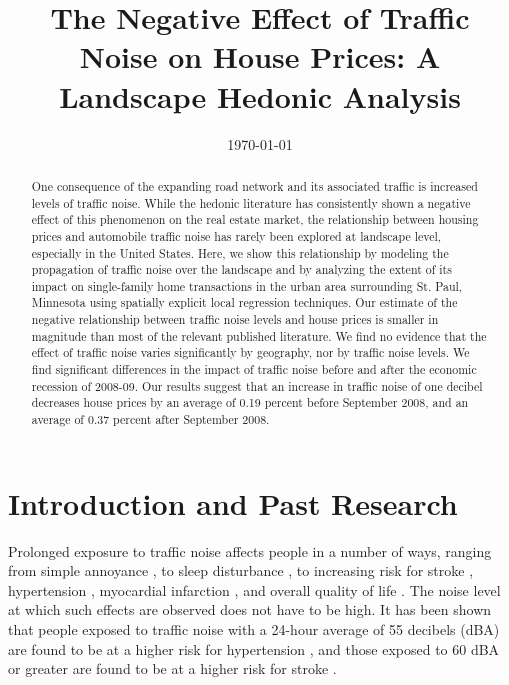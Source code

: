 \documentclass{article}\usepackage{graphicx, color}
\title{The Negative Effect of Traffic Noise on House Prices: A Landscape Hedonic Analysis}
\date{\today}
\begin{document}
\maketitle
\begin{singlespace}
\begin{abstract}
One consequence of the expanding road network and its associated traffic is increased levels of traffic noise.  While the hedonic literature has consistently shown a negative effect of this phenomenon on the real estate market, the relationship between housing prices and automobile traffic noise has rarely been explored at landscape level, especially in the United States. Here, we show this relationship by modeling the propagation of traffic noise over the landscape and by analyzing the extent of its impact on single-family home transactions in the urban area surrounding St. Paul, Minnesota using spatially explicit local regression techniques. Our estimate of the negative relationship between traffic noise levels and house prices is smaller in magnitude than most of the relevant published literature. We find no evidence that the effect of traffic noise varies significantly by geography, nor by traffic noise levels.  We find significant differences in the impact of traffic noise before and after the economic recession of 2008-09. Our results suggest that an increase in traffic noise of one decibel decreases house prices by an average of 0.19 percent before September 2008, and an average of 0.37 percent after September 2008.
\end{abstract}
\end{singlespace}

\section{Introduction and Past Research}\label{sec:lit}
Prolonged exposure to traffic noise affects people in a number of ways, ranging from simple annoyance \citep{Miedema2001, Ouis2001, Ohrstrom2007, DeKluizenaar2013, Weinhold2013}, to sleep disturbance , to increasing risk for stroke \citep{Sorensen2011}, hypertension \citep{Jarup2008, Bodin2009}, myocardial infarction \citep{Babisch2005}, and overall quality of life \citep{Shepherd2013}. The noise level at which such effects are observed does not have to be high.  It has been shown that people exposed to traffic noise with a 24-hour average of 55 decibels (dBA) are found to be at a higher risk for hypertension \citep{Barregard2009, Bodin2009}, and those exposed to 60 dBA or greater are found to be at a higher risk for stroke \citep{Sorensen2011}.  
\end{document}
